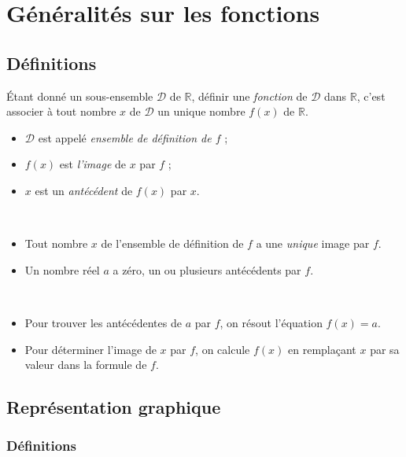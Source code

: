 \chapter{Généralités sur les fonctions}
\section{Définitions}

\begin{definition}
  Étant donné un sous-ensemble $\mathcal{D}$ de $\mathbb{R}$, définir une \emph{fonction} de $\mathcal{D}$ dans $\mathbb{R}$, c'est associer à tout nombre $x$ de $\mathcal{D}$ un unique nombre $f(x)$ de $\mathbb{R}$.

  \begin{itemize}[$\bullet$]
    \item $\mathcal{D}$ est appelé \emph{ensemble de définition de $f$} ;
    \item $f(x)$ est \emph{l'image} de $x$ par $f$ ;
    \item $x$ est un \emph{antécédent} de $f(x)$ par $x$.
  \end{itemize}
\end{definition}

\begin{remarque}~
  \begin{itemize}
    \item Tout nombre $x$ de l'ensemble de définition de $f$ a une \emph{unique} image par $f$.
    \item Un nombre réel $a$ a zéro, un ou plusieurs antécédents par $f$.
  \end{itemize}
\end{remarque}

\begin{methode}~
  \begin{itemize}
    \item Pour trouver les antécédentes de $a$ par $f$, on résout l'équation $f(x)=a$.
    \item Pour déterminer l'image de $x$ par $f$, on calcule $f(x)$ en remplaçant $x$ par sa valeur dans la formule de $f$.
  \end{itemize}
\end{methode}

\section{Représentation graphique}

\subsection{Définitions}


